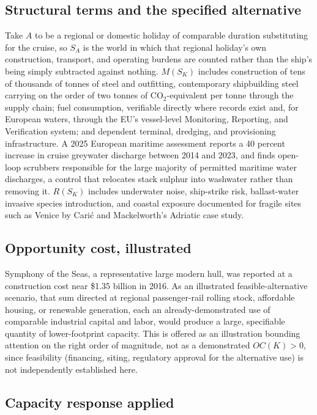 \documentclass[11pt]{article}
\begin{document}
\subsection{Structural terms and the specified alternative}

Take $A$ to be a regional or domestic holiday of comparable duration substituting for the cruise, so $S_A$ is the world in which that regional holiday's own construction, transport, and operating burdens are counted rather than the ship's being simply subtracted against nothing. $M(S_K)$ includes construction of tens of thousands of tonnes of steel and outfitting, contemporary shipbuilding steel carrying on the order of two tonnes of CO$_2$-equivalent per tonne through the supply chain; fuel consumption, verifiable directly where records exist and, for European waters, through the EU's vessel-level Monitoring, Reporting, and Verification system; and dependent terminal, dredging, and provisioning infrastructure. A 2025 European maritime assessment reports a 40 percent increase in cruise greywater discharge between 2014 and 2023, and finds open-loop scrubbers responsible for the large majority of permitted maritime water discharges, a control that relocates stack sulphur into washwater rather than removing it. $R(S_K)$ includes underwater noise, ship-strike risk, ballast-water invasive species introduction, and coastal exposure documented for fragile sites such as Venice by Cari\'c and Mackelworth's Adriatic case study.

\subsection{Opportunity cost, illustrated}

Symphony of the Seas, a representative large modern hull, was reported at a construction cost near \$1.35 billion in 2016. As an illustrated feasible-alternative scenario, that sum directed at regional passenger-rail rolling stock, affordable housing, or renewable generation, each an already-demonstrated use of comparable industrial capital and labor, would produce a large, specifiable quantity of lower-footprint capacity. This is offered as an illustration bounding attention on the right order of magnitude, not as a demonstrated $OC(K) > 0$, since feasibility (financing, siting, regulatory approval for the alternative use) is not independently established here.

\subsection{Capacity response applied}
\end{document}
